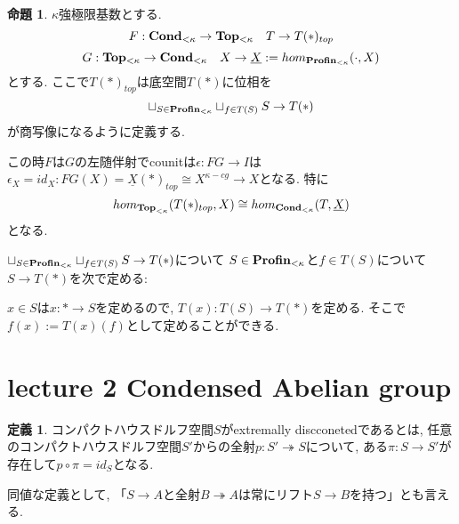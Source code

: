 \documentclass[dvipdfmx,a4paper,11pt]{article}
\theoremstyle{definition}
\newtheorem{prop}[thm]{命題}
\newtheorem{dfn}[thm]{定義}
\newcommand{\xr}[1]{\textcolor{red}{#1}}
\begin{document}
  \begin{tcolorbox}
 [colback = white, colframe = green!35!black, fonttitle = \bfseries,breakable = true]
\begin{prop}\cite[proposition 1.7]{Sch19}
$\kappa$強極限基数とする. 
$$
F : {\bf Cond}_{< \kappa} \to {\bf Top_{<\kappa}} \quad T \to T(\ast)_{top}
$$
$$
G :  {\bf Top_{<\kappa}} \to {\bf Cond}_{< \kappa} \quad X \to \underline{X}:=hom_{{\bf Profin}_{<\kappa}}(\cdot, X)
$$
とする. 
ここで$T(\ast)_{top}$は底空間$T(\ast)$に位相を
$$
\sqcup_{S \in {\bf Profin}_{<\kappa}}  \sqcup_{f \in T(S) }  S \to T(\ast)
$$
が商写像になるように定義する.

この時$F$は$G$の左随伴射でcounitは$\epsilon : FG \to I$は$\epsilon_{X}=id_{X}: FG(X)=\underline{X}(\ast)_{top}\cong X^{\kappa-cg} \to X$となる. 
特に
$$
hom_{{\bf Top}_{<\kappa}}(T(\ast)_{top}, X) \cong hom_{{\bf Cond}_{<\kappa}}(T, \underline{X})
$$
となる. 
 \end{prop}
 \end{tcolorbox}

$\sqcup_{S \in {\bf Profin}_{<\kappa}}  \sqcup_{f \in T(S) }  S \to T(\ast)$について
$S \in {\bf Profin}_{<\kappa}$と$f \in T(S)$について$S \to T(\ast)$を次で定める:

$x \in S$は$x : \ast \to S$を定めるので, 
$T(x) : T(S) \to T(\ast)$を定める.
そこで$f(x):=T(x)(f)$として定めることができる. 



\newpage

\section{lecture 2 Condensed Abelian group}

  \begin{tcolorbox}
 [colback = white, colframe = green!35!black, fonttitle = \bfseries,breakable = true]
\begin{dfn}\cite[Definition 2.4]{Sch19}
コンパクトハウスドルフ空間$S$がextremally discconetedであるとは, 任意のコンパクトハウスドルフ空間$S'$からの全射$ p : S '  \twoheadrightarrow S$について, ある$\pi : S \to S'$が存在して$p \circ \pi = id_{S}$となる. 
 \end{dfn}
 \end{tcolorbox}
 
 同値な定義として, 「$S \to A$と全射$B \twoheadrightarrow A$は常にリフト$S \to B$を持つ」とも言える. 
 
\end{document}
